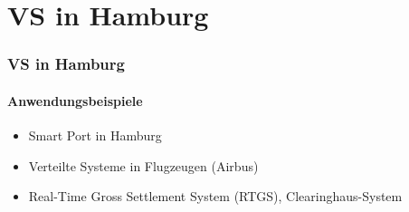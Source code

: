 \section{VS in Hamburg}
\begin{frame}
  \frametitle{VS in Hamburg}
  \framesubtitle{Anwendungsbeispiele}
  \begin{itemize}
    \item Smart Port in Hamburg
    \item Verteilte Systeme in Flugzeugen (Airbus)
    \item Real-Time Gross Settlement System (RTGS), Clearinghaus-System
  \end{itemize}
\end{frame}
